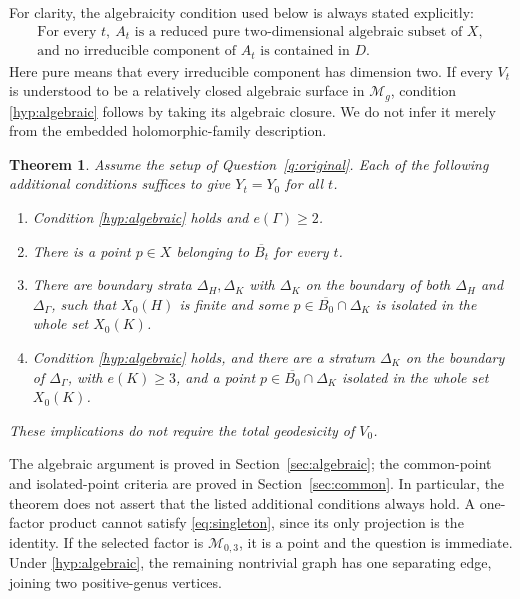 \documentclass[11pt]{article}
\newcommand{\M}{\mathcal M}
\newcommand{\cl}[1]{\overline{#1}}
\newtheorem{theorem}{Theorem}[section]
\theoremstyle{definition}
\theoremstyle{remark}
\begin{document}
For clarity, the algebraicity condition used below is always stated explicitly:
\begin{equation}\tag{A}\label{hyp:algebraic}
 \begin{gathered}
 \text{For every }t,\ A_t\text{ is a reduced pure two-dimensional algebraic subset of }X,\\
 \text{and no irreducible component of }A_t\text{ is contained in }D.
 \end{gathered}
\end{equation}
Here pure means that every irreducible component has dimension two. If every $V_t$ is understood to be a relatively closed algebraic surface in $\M_g$, condition \eqref{hyp:algebraic} follows by taking its algebraic closure. We do not infer it merely from the embedded holomorphic-family description.

\begin{theorem}\label{thm:main}
Assume the setup of Question~\ref{q:original}. Each of the following additional conditions suffices to give $Y_t=Y_0$ for all $t$.
\begin{enumerate}[label=(\alph*),leftmargin=*]
\item\label{main:edges} Condition \eqref{hyp:algebraic} holds and $e(\Gamma)\geq2$.
\item\label{main:common} There is a point $p\in X$ belonging to $\cl{B_t}$ for every $t$.
\item\label{main:finite} There are boundary strata $\Delta_H,\Delta_K$ with $\Delta_K$ on the boundary of both $\Delta_H$ and $\Delta_\Gamma$, such that $X_0(H)$ is finite and some $p\in\cl{B_0}\cap\Delta_K$ is isolated in the whole set $X_0(K)$.
\item\label{main:deep} Condition \eqref{hyp:algebraic} holds, and there are a stratum $\Delta_K$ on the boundary of $\Delta_\Gamma$, with $e(K)\geq3$, and a point $p\in\cl{B_0}\cap\Delta_K$ isolated in the whole set $X_0(K)$.
\end{enumerate}
These implications do not require the total geodesicity of $V_0$.
\end{theorem}

The algebraic argument is proved in Section~\ref{sec:algebraic}; the common-point and isolated-point criteria are proved in Section~\ref{sec:common}. In particular, the theorem does not assert that the listed additional conditions always hold. A one-factor product cannot satisfy \eqref{eq:singleton}, since its only projection is the identity. If the selected factor is $\M_{0,3}$, it is a point and the question is immediate. Under \eqref{hyp:algebraic}, the remaining nontrivial graph has one separating edge, joining two positive-genus vertices.
\end{document}
